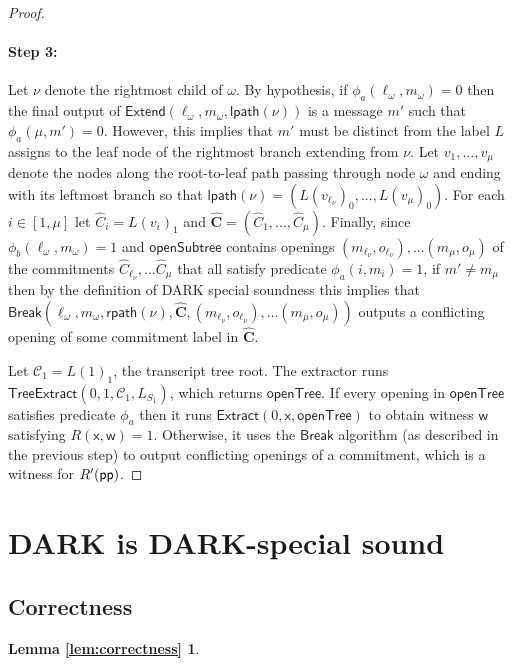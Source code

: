 \begin{proof}
\paragraph{Step 3:}  Let $\nu$ denote the rightmost child of $\omega$. By hypothesis, if $\phi_a(\ell_\omega, m_\omega) = 0$ then the final output of $\textsf{Extend}(\ell_\omega, m_\omega, \textsf{lpath}(\nu))$ is a message $m'$ such that $\phi_a(\mu, m') = 0$. However, this implies that $m'$ must be distinct from the label $L$ assigns to the leaf node of the rightmost branch extending from $\nu$. Let $v_1,...,v_\mu$ denote the nodes along the root-to-leaf path passing through node $\omega$ and ending with its leftmost branch so that $\textsf{lpath}(\nu) = (L(v_{\ell_\nu})_0,...,L(v_\mu)_0)$. For each $i \in [1, \mu]$ let $\hat{C}_i = L(v_i)_1$ and $\mathbf{\hat{C}} = (\hat{C}_1,...,\hat{C}_\mu)$. Finally, since $\phi_b(\ell_\omega, m_\omega) = 1$ and $\textsf{openSubtree}$ contains openings $(m_{\ell_\nu}, o_{\ell_\nu}),...(m_\mu, o_\mu)$ of the commitments $\hat{C}_{\ell_\nu},...\hat{C}_\mu$ that all satisfy predicate $\phi_a(i, m_i) = 1$, if $m' \neq m_\mu$ then by the definition of DARK special soundness this implies that $\textsf{Break}(\ell_\omega, m_\omega,  \textsf{rpath}(\nu), \mathbf{\hat{C}}, (m_{\ell_\nu}, o_{\ell_\nu}),...(m_{\mu}, o_{\mu}))$ outputs a conflicting opening of some commitment label in $\mathbf{\hat{C}}$. 




Let $\mathcal{C}_1 = L(1)_1$, the transcript tree root. The extractor runs $\textsf{TreeExtract}(0, 1, \mathcal{C}_1, L_{S_1})$, which returns $\textsf{openTree}$. If every opening in $\textsf{openTree}$ satisfies predicate $\phi_a$ then it runs $\textsf{Extract}(0, \mathsf{x}, \textsf{openTree})$ to obtain witness $\mathsf{w}$ satisfying $R(\mathsf{x}, \mathsf{w}) = 1$. Otherwise, it uses the $\textsf{Break}$ algorithm (as described in the previous step) to output conflicting openings of a commitment, which is a witness for $R'(\textsf{pp})$.
	
\end{proof}

\section{DARK is DARK-special sound}
\label{appendix:darkisdark}

\subsection{Correctness}
\label{sec:darkcorrectness}
\def\thelemma{\ref{lem:correctness}}
\newtheorem*{lemmacorrectness}{Lemma \ref{lem:correctness}}
\begin{lemmacorrectness}
	\correctnesslemma
\end{lemmacorrectness}

